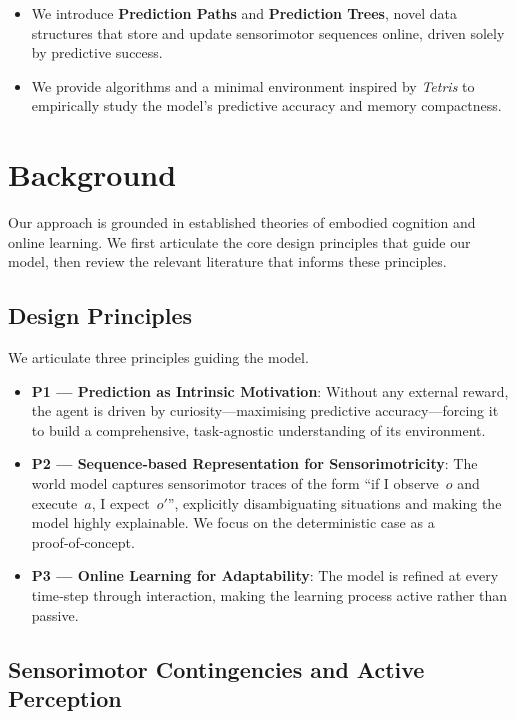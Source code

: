 \documentclass[11pt]{article}
\begin{document}
\begin{itemize}[itemsep=0.2em]
\item We introduce \textbf{Prediction Paths} and \textbf{Prediction Trees}, novel data structures that store and update sensorimotor sequences online, driven solely by predictive success.
\item We provide algorithms and a minimal environment inspired by \emph{Tetris} to empirically study the model's predictive accuracy and memory compactness.
\end{itemize}

\section{Background}

Our approach is grounded in established theories of embodied cognition and online learning. We first articulate the core design principles that guide our model, then review the relevant literature that informs these principles.

\subsection{Design Principles}

We articulate three principles guiding the model.

\begin{itemize}[itemsep=0.2em]
\item \textbf{P1 — Prediction as Intrinsic Motivation}: Without any external reward, the agent is driven by curiosity—maximising predictive accuracy—forcing it to build a comprehensive, task‑agnostic understanding of its environment.
\item \textbf{P2 — Sequence‑based Representation for Sensorimotricity}: The world model captures sensorimotor traces of the form “if I observe $o$ and execute $a$, I expect $o'$”, explicitly disambiguating situations and making the model highly explainable. We focus on the deterministic case as a proof‑of‑concept.
\item \textbf{P3 — Online Learning for Adaptability}: The model is refined at every time‑step through interaction, making the learning process active rather than passive.
\end{itemize}

\subsection{Sensorimotor Contingencies and Active Perception}
\end{document}
